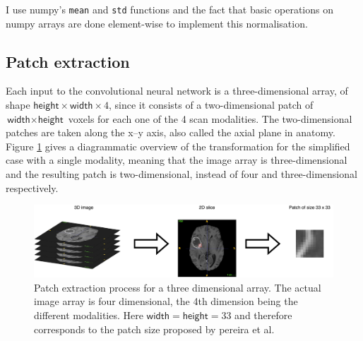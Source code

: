 \documentclass[12pt,a4paper,twoside,openright]{report}
\begin{document}
I use numpy's \texttt{mean} and \texttt{std} functions and the fact that basic operations on numpy arrays are done element-wise to implement this normalisation.

\subsection{Patch extraction}
\label{section:patch_extraction}
Each input to the convolutional neural network is a three-dimensional array, of shape $\textsf{height} \times \textsf{width} \times 4$, since it consists of a two-dimensional patch of $\textsf{width} \times \textsf{height}$ voxels for each one of the 4 scan modalities. The two-dimensional patches are taken along the x--y axis, also called the axial plane in anatomy. Figure \ref{fig:patch_extraction} gives a diagrammatic overview of the transformation for the simplified case with a single modality, meaning that the image array is three-dimensional and the resulting patch is two-dimensional, instead of four and three-dimensional respectively.
\begin{figure}
	\centering
	\includegraphics[width=\textwidth]{patch_extraction}
	\caption[Patch extraction process for a three dimensional array.]{Patch extraction process for a three dimensional array. The actual image array is four dimensional, the 4th dimension being the different modalities. Here $\textsf{width}=\textsf{height}=33$ and therefore corresponds to the patch size proposed by pereira et al.}
	\label{fig:patch_extraction}
\end{figure}
\end{document}

